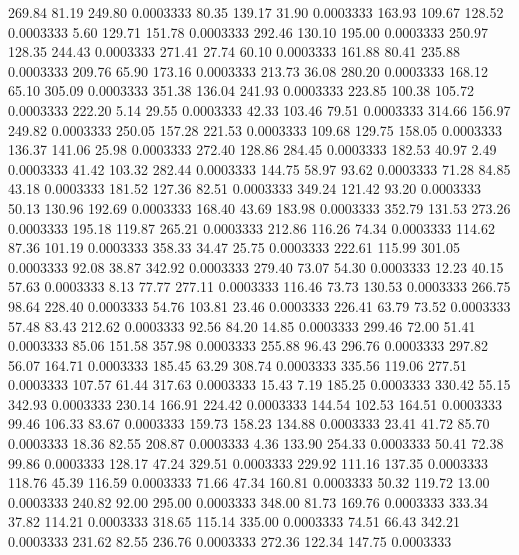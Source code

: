  269.84   81.19  249.80   0.0003333
  80.35  139.17   31.90   0.0003333
 163.93  109.67  128.52   0.0003333
   5.60  129.71  151.78   0.0003333
 292.46  130.10  195.00   0.0003333
 250.97  128.35  244.43   0.0003333
 271.41   27.74   60.10   0.0003333
 161.88   80.41  235.88   0.0003333
 209.76   65.90  173.16   0.0003333
 213.73   36.08  280.20   0.0003333
 168.12   65.10  305.09   0.0003333
 351.38  136.04  241.93   0.0003333
 223.85  100.38  105.72   0.0003333
 222.20    5.14   29.55   0.0003333
  42.33  103.46   79.51   0.0003333
 314.66  156.97  249.82   0.0003333
 250.05  157.28  221.53   0.0003333
 109.68  129.75  158.05   0.0003333
 136.37  141.06   25.98   0.0003333
 272.40  128.86  284.45   0.0003333
 182.53   40.97    2.49   0.0003333
  41.42  103.32  282.44   0.0003333
 144.75   58.97   93.62   0.0003333
  71.28   84.85   43.18   0.0003333
 181.52  127.36   82.51   0.0003333
 349.24  121.42   93.20   0.0003333
  50.13  130.96  192.69   0.0003333
 168.40   43.69  183.98   0.0003333
 352.79  131.53  273.26   0.0003333
 195.18  119.87  265.21   0.0003333
 212.86  116.26   74.34   0.0003333
 114.62   87.36  101.19   0.0003333
 358.33   34.47   25.75   0.0003333
 222.61  115.99  301.05   0.0003333
  92.08   38.87  342.92   0.0003333
 279.40   73.07   54.30   0.0003333
  12.23   40.15   57.63   0.0003333
   8.13   77.77  277.11   0.0003333
 116.46   73.73  130.53   0.0003333
 266.75   98.64  228.40   0.0003333
  54.76  103.81   23.46   0.0003333
 226.41   63.79   73.52   0.0003333
  57.48   83.43  212.62   0.0003333
  92.56   84.20   14.85   0.0003333
 299.46   72.00   51.41   0.0003333
  85.06  151.58  357.98   0.0003333
 255.88   96.43  296.76   0.0003333
 297.82   56.07  164.71   0.0003333
 185.45   63.29  308.74   0.0003333
 335.56  119.06  277.51   0.0003333
 107.57   61.44  317.63   0.0003333
  15.43    7.19  185.25   0.0003333
 330.42   55.15  342.93   0.0003333
 230.14  166.91  224.42   0.0003333
 144.54  102.53  164.51   0.0003333
  99.46  106.33   83.67   0.0003333
 159.73  158.23  134.88   0.0003333
  23.41   41.72   85.70   0.0003333
  18.36   82.55  208.87   0.0003333
   4.36  133.90  254.33   0.0003333
  50.41   72.38   99.86   0.0003333
 128.17   47.24  329.51   0.0003333
 229.92  111.16  137.35   0.0003333
 118.76   45.39  116.59   0.0003333
  71.66   47.34  160.81   0.0003333
  50.32  119.72   13.00   0.0003333
 240.82   92.00  295.00   0.0003333
 348.00   81.73  169.76   0.0003333
 333.34   37.82  114.21   0.0003333
 318.65  115.14  335.00   0.0003333
  74.51   66.43  342.21   0.0003333
 231.62   82.55  236.76   0.0003333
 272.36  122.34  147.75   0.0003333
